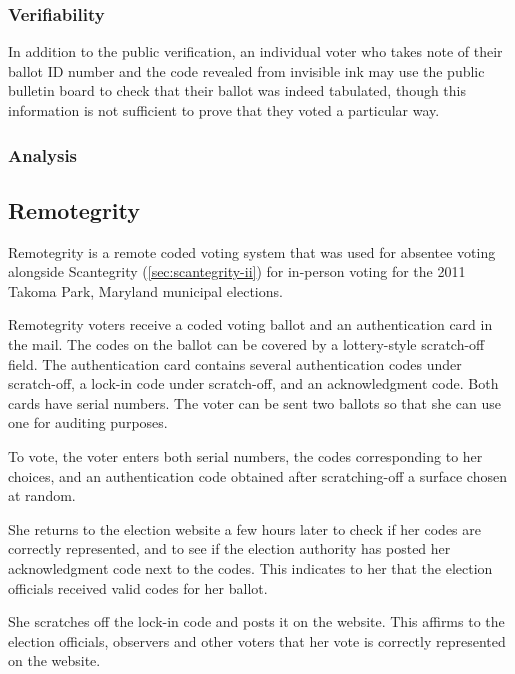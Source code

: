 \subsubsection{Verifiability}

In addition to the public verification, an individual voter who takes
note of their ballot ID number and the code revealed from invisible
ink may use the public bulletin board to check that their ballot was
indeed tabulated, though this information is not sufficient to prove
that they voted a particular way.

\subsubsection{Analysis}


\subsection{Remotegrity~\cite{zagorski2013}}
\label{sec:remotegrity}
Remotegrity is a remote coded voting system that was used for absentee
voting alongside Scantegrity (\ref{sec:scantegrity-ii}) for in-person
voting for the 2011 Takoma Park, Maryland municipal elections.

Remotegrity voters receive a coded voting ballot and an authentication
card in the mail. The codes on the ballot can be covered by a
lottery-style scratch-off field. The authentication card contains
several authentication codes under scratch-off, a lock-in code under
scratch-off, and an acknowledgment code. Both cards have serial
numbers. The voter can be sent two ballots so that she can use one for
auditing purposes.

To vote, the voter enters both serial numbers, the codes corresponding
to her choices, and an authentication code obtained after
scratching-off a surface chosen at random.

She returns to the election website a few hours later to check if her
codes are correctly represented, and to see if the election authority
has posted her acknowledgment code next to the codes. This indicates
to her that the election officials received valid codes for her
ballot.

She scratches off the lock-in code and posts it on the website. This
affirms to the election officials, observers and other voters that her
vote is correctly represented on the website.

